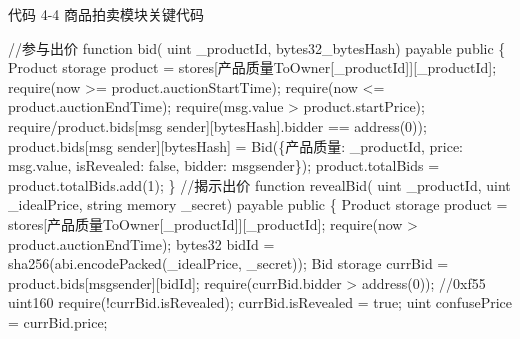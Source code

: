 \documentclass[
  10
]{article}
\newenvironment{Shaded}{}{}
\newcommand{\NormalTok}[1]{#1}
\begin{document}
代码 4-4 商品拍卖模块关键代码

\begin{Shaded}
\begin{Highlighting}[]
\NormalTok{//参与出价  }
\NormalTok{function bid( uint \_productId, bytes32\_bytesHash) payable public \{  }
\NormalTok{Product storage product = stores[产品质量ToOwner[\_productId]][\_productId];  }
\NormalTok{require(now \textgreater{}= product.auctionStartTime);  }
\NormalTok{require(now \textless{}= product.auctionEndTime);  }
\NormalTok{require(msg.value \textgreater{} product.startPrice);  }
\NormalTok{require/product.bids[msg sender][bytesHash].bidder == address(0));  }
\NormalTok{product.bids[msg sender][bytesHash] = Bid(\{产品质量: \_productId, price: msg.value, isRevealed: false, bidder: msgsender\});  }
\NormalTok{product.totalBids = product.totalBids.add(1);  }
\NormalTok{\}  }
\NormalTok{//揭示出价  }
\NormalTok{function revealBid( uint \_productId, uint \_idealPrice, string memory \_secret) payable public \{  }
\NormalTok{Product storage product = stores[产品质量ToOwner[\_productId]][\_productId];  }
\NormalTok{require(now \textgreater{} product.auctionEndTime);  }
\NormalTok{bytes32 bidId = sha256(abi.encodePacked(\_idealPrice, \_secret));  }
\NormalTok{Bid storage currBid = product.bids[msgsender][bidId];  }
\NormalTok{require(currBid.bidder \textgreater{} address(0)); //0xf55 uint160  }
\NormalTok{require(!currBid.isRevealed);  }
\NormalTok{currBid.isRevealed = true;  }
\NormalTok{uint confusePrice = currBid.price;}
\end{Highlighting}
\end{Shaded}
\end{document}
